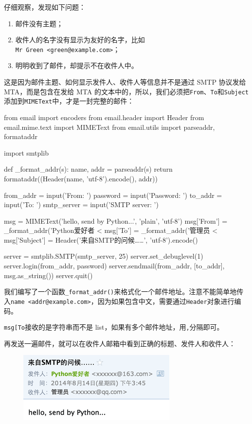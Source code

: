 仔细观察，发现如下问题：

\begin{enumerate}
\def\labelenumi{\arabic{enumi}.}
\item
  邮件没有主题；
\item
  收件人的名字没有显示为友好的名字，比如\texttt{Mr\ Green\ \textless{}green@example.com\textgreater{}}；
\item
  明明收到了邮件，却提示不在收件人中。
\end{enumerate}

这是因为邮件主题、如何显示发件人、收件人等信息并不是通过 SMTP 协议发给
MTA，而是包含在发给 MTA
的文本中的，所以，我们必须把\texttt{From}、\texttt{To}和\texttt{Subject}添加到\texttt{MIMEText}中，才是一封完整的邮件：

\begin{pythoncode}
from email import encoders
from email.header import Header
from email.mime.text import MIMEText
from email.utils import parseaddr, formataddr

import smtplib
    
def _format_addr(s):
    name, addr = parseaddr(s)
    return formataddr((Header(name, 'utf-8').encode(), addr))

from_addr = input('From: ')
password = input('Password: ')
to_addr = input('To: ')
smtp_server = input('SMTP server: ')

msg = MIMEText('hello, send by Python...', 'plain', 'utf-8')
msg['From'] = _format_addr('Python爱好者 <%
msg['To'] = _format_addr('管理员 <%
msg['Subject'] = Header('来自SMTP的问候……', 'utf-8').encode()
    
server = smtplib.SMTP(smtp_server, 25)
server.set_debuglevel(1)
server.login(from_addr, password)
server.sendmail(from_addr, [to_addr], msg.as_string())
server.quit()
\end{pythoncode}

我们编写了一个函数\texttt{\_format\_addr()}来格式化一个邮件地址。注意不能简单地传入\texttt{name\ \textless{}addr@example.com\textgreater{}}，因为如果包含中文，需要通过\texttt{Header}对象进行编码。

\texttt{msg{[}\textquotesingle{}To\textquotesingle{}{]}}接收的是字符串而不是
list，如果有多个邮件地址，用\texttt{,}分隔即可。

再发送一遍邮件，就可以在收件人邮箱中看到正确的标题、发件人和收件人：

 
 \begin{figure}[htp]
	\centering
	\includegraphics[width=0.6\linewidth]{fig/967453175707264.png}
\end{figure}


